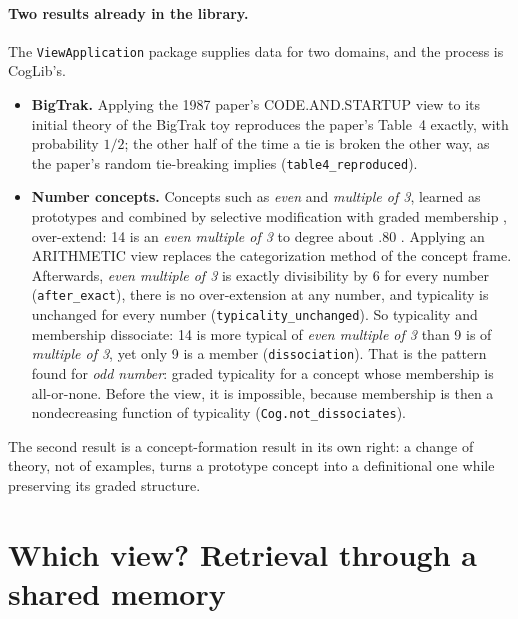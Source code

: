 \documentclass[11pt]{article}
\newcommand{\code}[1]{\texttt{#1}}
\newcommand{\lean}[1]{\texttt{#1}}
\begin{document}
\paragraph{Two results already in the library.} The \code{ViewApplication} package supplies data for two domains, and the process is CogLib's.
\begin{itemize}
  \item \textbf{BigTrak.} Applying the 1987 paper's CODE.AND.STARTUP view to its initial theory of the BigTrak toy reproduces the paper's Table~4 exactly, with probability $1/2$; the other half of the time a tie is broken the other way, as the paper's random tie-breaking implies (\lean{table4\_reproduced}).
  \item \textbf{Number concepts.} Concepts such as \emph{even} and \emph{multiple of 3}, learned as prototypes and combined by selective modification \citep{smith1988} with graded membership \citep{hampton2007}, over-extend: 14 is an \emph{even multiple of 3} to degree about $.80$ \citep[cf.][]{hampton1988}. Applying an ARITHMETIC view replaces the categorization method of the concept frame. Afterwards, \emph{even multiple of 3} is exactly divisibility by 6 for every number (\lean{after\_exact}), there is no over-extension at any number, and typicality is unchanged for every number (\lean{typicality\_unchanged}). So typicality and membership dissociate: 14 is more typical of \emph{even multiple of 3} than 9 is of \emph{multiple of 3}, yet only 9 is a member (\lean{dissociation}). That is the pattern \citet{armstrong1983} found for \emph{odd number}: graded typicality for a concept whose membership is all-or-none. Before the view, it is impossible, because membership is then a nondecreasing function of typicality (\lean{Cog.not\_dissociates}).
\end{itemize}
The second result is a concept-formation result in its own right: a change of theory, not of examples, turns a prototype concept into a definitional one while preserving its graded structure.

\section{Which view? Retrieval through a shared memory}
\label{sec:select}
\end{document}
